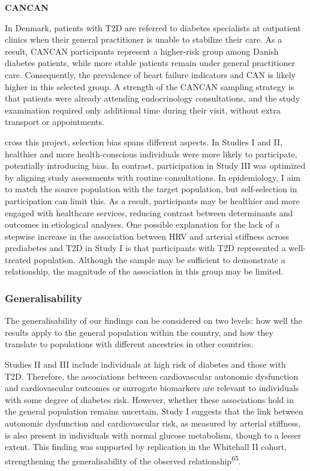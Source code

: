\documentclass[
  a4paper,
  headsepline=true,
  open=any]{scrbook}
\begin{document}
\textbf{CANCAN}

In Denmark, patients with T2D are referred to diabetes specialists at
outpatient clinics when their general practitioner is unable to
stabilize their care. As a result, CANCAN participants represent a
higher-risk group among Danish diabetes patients, while more stable
patients remain under general practitioner care. Consequently, the
prevalence of heart failure indicators and CAN is likely higher in this
selected group. A strength of the CANCAN sampling strategy is that
patients were already attending endocrinology consultations, and the
study examination required only additional time during their visit,
without extra transport or appointments.

cross this project, selection bias spans different aspects. In Studies I
and II, healthier and more health-conscious individuals were more likely
to participate, potentially introducing bias. In contrast, participation
in Study III was optimized by aligning study assessments with routine
consultations. In epidemiology, I aim to match the source population
with the target population, but self-selection in participation can
limit this. As a result, participants may be healthier and more engaged
with healthcare services, reducing contrast between determinants and
outcomes in etiological analyses. One possible explanation for the lack
of a stepwise increase in the association between HRV and arterial
stiffness across prediabetes and T2D in Study I is that participants
with T2D represented a well-treated population. Although the sample may
be sufficient to demonstrate a relationship, the magnitude of the
association in this group may be limited.

\hypertarget{generalisability}{%
\subsubsection{Generalisability}\label{generalisability}}

The generalisability of our findings can be considered on two levels:
how well the results apply to the general population within the country,
and how they translate to populations with different ancestries in other
countries.

Studies II and III include individuals at high risk of diabetes and
those with T2D. Therefore, the associations between cardiovascular
autonomic dysfunction and cardiovascular outcomes or surrogate
biomarkers are relevant to individuals with some degree of diabetes
risk. However, whether these associations hold in the general population
remains uncertain. Study I suggests that the link between autonomic
dysfunction and cardiovascular risk, as measured by arterial stiffness,
is also present in individuals with normal glucose metabolism, though to
a lesser extent. This finding was supported by replication in the
Whitehall II cohort, strengthening the generalisability of the observed
relationship\textsuperscript{65}.
\end{document}

